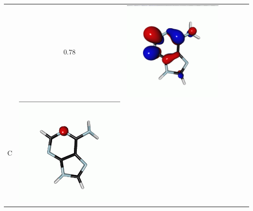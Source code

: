 \documentclass[journal=jctcce,manuscript=article]{achemso}
\begin{document}
\begin{table}[H]
\begin{tabular}{ l | c c c | c c c }
\begin{minipage}{0.2\textwidth}
    \end{minipage}
    & 0.78 & 
    \begin{minipage}{0.2\textwidth}
        \centering
        \includegraphics[scale=0.10]{NTO/Adenine_N/2p_Cs.png}
    \end{minipage}
    \\
            C &  
    \begin{minipage}{0.2\textwidth}
        \centering
        \includegraphics[scale=0.10]{NTO/Adenine_N/3h_C1.png}

\end{minipage}
\end{tabular}
\end{table}
\end{document}
